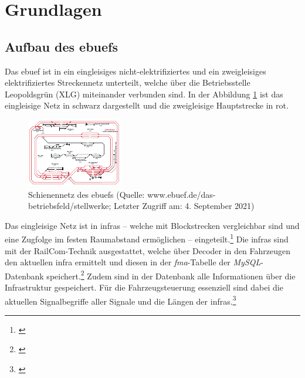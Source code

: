 \section{Grundlagen} \label{grundlagenKapitel}
\subsection{Aufbau des \acl{ebuef}s}
Das \ac{ebuef} ist in ein eingleisiges nicht-elektrifiziertes und ein zweigleisiges elektrifiziertes Streckennetz unterteilt, welche über die Betriebsstelle Leopoldsgrün (XLG) miteinander verbunden sind. In der Abbildung \ref{fig:ebuefNetz} ist das eingleisige Netz in schwarz dargestellt und die zweigleisige Hauptstrecke in rot.
\begin{figure}
  \includegraphics[width=\linewidth]{../images/netz/plan.pdf}
  \caption[Schienennetz des \ac{ebuef}s]{Schienennetz des \ac{ebuef}s (Quelle: www.ebuef.de/das-betriebs\-feld/stell\-werke; Letzter Zugriff am: 4. September 2021)}
  \label{fig:ebuefNetz}
\end{figure}
Das eingleisige Netz ist in \acp{infra} -- welche mit Blockstrecken vergleichbar sind und eine Zugfolge im festen Raumabstand ermöglichen -- eingeteilt.\footnote{\citet[S. 7, 42]{pachl1999systemtechnik}} Die \acp{infra} sind mit der RailCom-Technik ausgestattet, welche über Decoder in den Fahrzeugen den aktuellen \ac{infra} ermittelt und diesen in der \textit{fma}-Tabelle der \textit{MySQL}-Datenbank speichert.\footnote{\cite{railcomnorm}} Zudem sind in der Datenbank alle Informationen über die Infrastruktur gespeichert. Für die Fahrzeugsteuerung essenziell sind dabei die aktuellen Signalbegriffe aller Signale und die Längen der \acp{infra}.\footnote{\cite{ebuef}}

